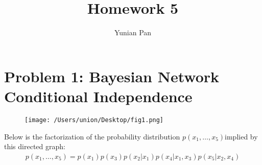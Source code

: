 \documentclass[a4paper,12pt]{article}
\begin{document}
\title{\textbf{Homework 5}}
\author{Yunian Pan}
\maketitle{}

\section{Problem 1: Bayesian Network Conditional Independence}

\begin{figure}[htp]
\centering
\texttt{[image: /Users/union/Desktop/fig1.png]}
\end{figure}
 Below is the factorization of the probability distribution $p(x_1, \ldots, x_5) $implied by this directed graph:
\begin{align}
 p(x_1, \ldots, x_5) = p(x_1)p(x_3)p(x_2\lvert x_1)p(x_4 \lvert x_1,x_3)p(x_5 \lvert x_2, x_4) \nonumber
\end{align}
\end{document}
